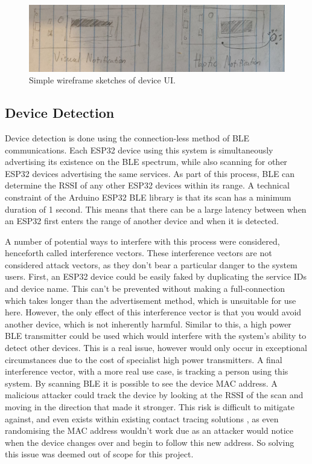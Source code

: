 \documentclass{l4proj}
\begin{document}
\begin{figure}[!htb]
    \centering
    \includegraphics[width=1.0\linewidth]{images/device_ui_sketch.png}

    \caption{ Simple wireframe sketches of device UI. }

    \label{fig:device_ui_sketch}
\end{figure}

\subsection{Device Detection}

Device detection is done using the connection-less method of BLE communications. Each ESP32 device using this system is simultaneously advertising its existence on the BLE spectrum, while also scanning for other ESP32 devices advertising the same services. As part of this process, BLE can determine the RSSI of any other ESP32 devices within its range. A technical constraint of the Arduino ESP32 BLE library is that its scan has a minimum duration of 1 second. This means that there can be a large latency between when an ESP32 first enters the range of another device and when it is detected.

A number of potential ways to interfere with this process were considered, henceforth called interference vectors. These interference vectors are not considered attack vectors, as they don't bear a particular danger to the system users. First, an ESP32 device could be easily faked by duplicating the service IDs and device name. This can't be prevented without making a full-connection which takes longer than the advertisement method, which is unsuitable for use here. However, the only effect of this interference vector is that you would avoid another device, which is not inherently harmful. Similar to this, a high power BLE transmitter could be used which would interfere with the system's ability to detect other devices. This is a real issue, however would only occur in exceptional circumstances due to the cost of specialist high power transmitters. A final interference vector, with a more real use case, is tracking a person using this system. By scanning BLE it is possible to see the device MAC address. A malicious attacker could track the device by looking at the RSSI of the scan and moving in the direction that made it stronger. This risk is difficult to mitigate against, and even exists within existing contact tracing solutions \citep{ahmed_survey_2020}, as even randomising the MAC address wouldn't work due as an attacker would notice when the device changes over and begin to follow this new address. So solving this issue was deemed out of scope for this project.
\end{document}
